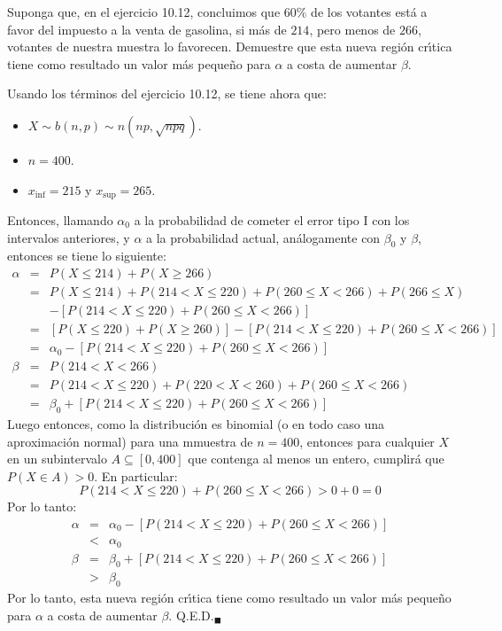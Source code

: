 \begin{enunciado}
 Suponga que, en el ejercicio 10.12, concluimos que $60\%$ de los votantes est\'a a favor del impuesto a la venta de gasolina, si m\'as de $214$, pero menos de $266$, votantes de nuestra muestra lo favorecen. Demuestre que esta nueva regi\'on cr\'{\i}tica tiene como resultado un valor m\'as peque\~no para $\alpha$ a costa de aumentar $\beta$.
\end{enunciado}

\begin{solucion}
 Usando los t\'erminos del ejercicio 10.12, se tiene ahora que:
 \begin{itemize}
  \item $X \sim b(n,p) \sim n\left( np, \sqrt{npq} \right)$.
  \item $n = 400$.
  \item $x_{\text{inf}} = 215$ y $x_{\text{sup}} = 265$.
 \end{itemize}
 Entonces, llamando $\alpha_0$ a la probabilidad de cometer el error tipo I con los intervalos anteriores, y $\alpha$ a la probabilidad actual, an\'alogamente con $\beta_0$ y $\beta$, entonces se tiene lo siguiente:
 \begin{eqnarray*}
  \alpha & = & P(X \leq 214) + P(X \geq 266) \\
  & = & P(X \leq 214) + P(214 < X \leq 220) + P(260 \leq X < 266) + P(266 \leq X) \\
  &  & - \left[ P(214 < X \leq 220) + P(260 \leq X < 266) \right] \\
  & = & \left[ P(X \leq 220) + P(X \geq 260) \right] - \left[ P(214 < X \leq 220) + P(260 \leq X < 266) \right] \\
  & = & \alpha_0 - \left[ P(214 < X \leq 220) + P(260 \leq X < 266) \right] \\
  \beta & = & P(214 < X < 266) \\
  & = & P(214 < X \leq 220) + P(220 < X < 260) + P(260 \leq X < 266) \\
  & = & \beta_0 + \left[ P(214 < X \leq 220) + P(260 \leq X < 266) \right]
 \end{eqnarray*}
 Luego entonces, como la distribuci\'on es binomial (o en todo caso una aproximaci\'on normal) para una mmuestra de $n = 400$, entonces para cualquier $X$ en un subintervalo $A \subseteq [0,400]$ que contenga al menos un entero, cumplir\'a que $P(X \in A) > 0$. En particular:
 \begin{equation*}
  P(214 < X \leq 220) + P(260 \leq X < 266) > 0 + 0 = 0
 \end{equation*}
 Por lo tanto:
 \begin{eqnarray*}
  \alpha & = & \alpha_0 - \left[ P(214 < X \leq 220) + P(260 \leq X < 266) \right] \\
  & < & \alpha_0 \\
  \beta & = & \beta_0 + \left[ P(214 < X \leq 220) + P(260 \leq X < 266) \right] \\
  & > & \beta_0
 \end{eqnarray*}
 Por lo tanto, esta nueva regi\'on cr\'{\i}tica tiene como resultado un valor m\'as peque\~no para $\alpha$ a costa de aumentar $\beta$. Q.E.D.${}_{\blacksquare}$
\end{solucion}
